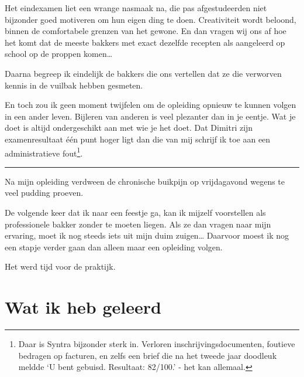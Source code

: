 \documentclass[
  11pt,
  dutch,
]{memoir}
\begin{document}
Het eindexamen liet een wrange nasmaak na, die pas afgestudeerden niet
bijzonder goed motiveren om hun eigen ding te doen. Creativiteit wordt
beloond, binnen de comfortabele grenzen van het gewone. En dan vragen
wij ons af hoe het komt dat de meeste bakkers met exact dezelfde
recepten als aangeleerd op school op de proppen komen\ldots{}

Daarna begreep ik eindelijk de bakkers die ons vertellen dat ze die
verworven kennis in de vuilbak hebben gesmeten.

En toch zou ik geen moment twijfelen om de opleiding opnieuw te kunnen
volgen in een ander leven. Bijleren van anderen is veel plezanter dan in
je eentje. Wat je doet is altijd ondergeschikt aan met wie je het doet.
Dat Dimitri zijn examenresultaat één punt hoger ligt dan die van mij
schrijf ik toe aan een administratieve fout\footnote{Daar is Syntra
  bijzonder sterk in. Verloren inschrijvingsdocumenten, foutieve
  bedragen op facturen, en zelfs een brief die na het tweede jaar
  doodleuk meldde `U bent gebuisd. Resultaat: 82/100.' - het kan
  allemaal.}.

\pfbreak

Na mijn opleiding verdween de chronische buikpijn op vrijdagavond wegens
te veel pudding proeven.

De volgende keer dat ik naar een feestje ga, kan ik mijzelf voorstellen
als professionele bakker zonder te moeten liegen. Als ze dan vragen naar
mijn ervaring, moet ik nog steeds iets uit mijn duim zuigen\ldots{}
Daarvoor moest ik nog een stapje verder gaan dan alleen maar een
opleiding volgen.

Het werd tijd voor de praktijk.

\newpage

\hypertarget{wat-ik-heb-geleerd-2}{%
\section{Wat ik heb geleerd}\label{wat-ik-heb-geleerd-2}}
\end{document}
